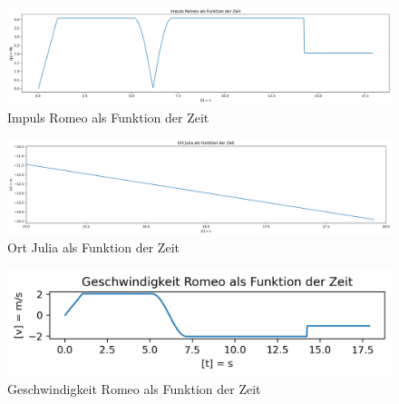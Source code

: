 \documentclass[../main.tex]{subfiles}
\begin{document}
    \begin{figure}[H]
        \begin{center}
            \centerline{\includegraphics[width=155mm]{./images/Inelastisch/ImpulsRomeo}}
            \caption{Impuls Romeo als Funktion der Zeit}
            \label{fig:ImpulsRomeo}
        \end{center}
    \end{figure}

    \begin{figure}[H]
        \begin{center}
            \centerline{\includegraphics[width=155mm]{./images/Inelastisch/OrtJuliaAlsFunktionDerZeit}}
            \caption{Ort Julia als Funktion der Zeit}
            \label{fig:OrtJuliaAlsFunktionDerZeit}
        \end{center}
    \end{figure}

    \begin{figure}[H]
        \begin{center}
            \centerline{\includegraphics[width=155mm]{./images/Inelastisch/GeschwindigkeitRomeo}}
            \caption{Geschwindigkeit Romeo als Funktion der Zeit}
            \label{fig:GeschwindigkeitRomeo}
        \end{center}
    \end{figure}
\end{document}
